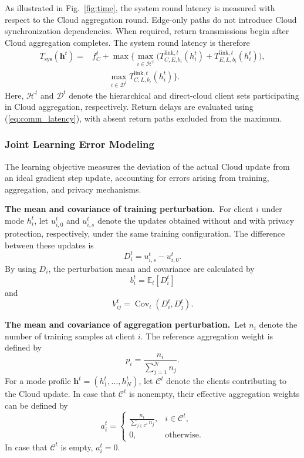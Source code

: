 \documentclass[5p,times]{elsarticle}
\theoremstyle{plain}
\theoremstyle{definition}
\theoremstyle{remark}
\begin{document}
As illustrated in Fig.~\ref{fig:time},
the system round latency is measured
with respect to the Cloud aggregation round.
Edge-only paths do not introduce Cloud
synchronization dependencies.
When required, return transmissions begin
after Cloud aggregation completes.
The system round latency is therefore
\begin{equation}
\begin{aligned}
T_{\mathrm{sys}}(\mathbf h^t)
={}&f_C^t+\max\Bigg\{
\max_{i\in\mathcal H^t}
\Big(
T_{C,E,b_i}^{\mathrm{link},t}(h_i^t)
+
T_{E,L,b_i}^{\mathrm{link},t}(h_i^t)
\Big),\\
&\qquad
\max_{i\in\mathcal D^t}
T_{C,L,b_i}^{\mathrm{link},t}(h_i^t)
\Bigg\}.
\end{aligned}
\label{eq:system_round_latency}
\end{equation}
Here, $\mathcal H^t$ and $\mathcal D^t$
denote the hierarchical and direct-cloud
client sets participating in Cloud
aggregation, respectively.
Return delays are evaluated using
(\ref{eq:comm_latency}), with absent
return paths excluded from the maximum.

\subsubsection{Joint Learning Error Modeling}
\label{sec:learning_cost}

The learning objective measures the deviation
of the actual Cloud update from an ideal
gradient step update, accounting for errors arising
from training, aggregation, and privacy
mechanisms.

\textbf{The mean and covariance of training perturbation.}\ 
For client $i$ under mode $h_i^t$,
let $u_{i,0}^t$ and $u_{i,s}^t$
denote the updates obtained without
and with privacy protection, respectively,
under the same training configuration.
The difference between these updates is
\begin{equation}
D_i^t=u_{i,s}^t-u_{i,0}^t.
\end{equation}
By using $D_i$, the perturbation mean and covariance are
calculated by
\begin{equation}
b_i^t=\mathbb E_t[D_i^t]
\end{equation}
and
\begin{equation}
V_{ij}^t=\operatorname{Cov}_t(D_i^t,D_j^t).
\end{equation}

\textbf{The mean and covariance of aggregation perturbation.}\ 
Let $n_i$ denote the number of training
samples at client $i$. The reference
aggregation weight is defined by
\begin{equation}
p_i=\frac{n_i}{\sum_{j=1}^{N}n_j}.
\end{equation}
For a mode profile
\(\mathbf h^t=\left(h_1^t,\ldots,h_N^t\right)\),
let \(\mathcal C^t\)
denote the clients contributing to the
Cloud update.
In case that \(\mathcal C^t\) is nonempty,
their effective aggregation weights can be defined by
\[
a_i^t=
\begin{cases}
\displaystyle
\frac{n_i}{\sum_{j\in\mathcal C^t}n_j},
& i\in\mathcal C^t,\\
0, & \text{otherwise}.
\end{cases}
\]
In case that \(\mathcal C^t\) is empty, \(a_i^t=0\).
\end{document}
